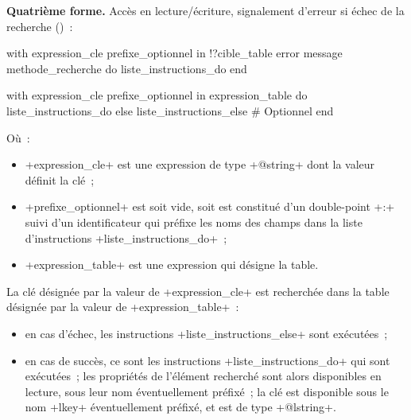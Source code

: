\textbf{Quatrième forme.} Accès en lecture/écriture, signalement d'erreur si échec de la recherche ()~:
\begin{galgas3}
with expression_cle prefixe_optionnel in !?cible_table
error message methode_recherche
do
  liste_instructions_do
end
\end{galgas3}






\begin{galgas3}
with expression_cle prefixe_optionnel in expression_table
do
  liste_instructions_do
else
  liste_instructions_else # Optionnel
end
\end{galgas3}

Où~:
\begin{itemize}
  \item \ggst+expression_cle+ est une expression de type \ggst+@string+ dont la valeur définit la clé~;
  \item \ggst+prefixe_optionnel+ est soit vide, soit est constitué d'un double-point \ggst+:+ suivi d'un identificateur qui préfixe les noms des champs dans la liste d'instructions \ggst+liste_instructions_do+~;
  \item \ggst+expression_table+ est une expression qui désigne la table.
\end{itemize}

La clé désignée par la valeur de \ggst+expression_cle+ est recherchée dans la table désignée par la valeur de \ggst+expression_table+~:
\begin{itemize}
  \item en cas d'échec, les instructions \ggst+liste_instructions_else+ sont exécutées~;
  \item en cas de succès, ce sont les instructions \ggst+liste_instructions_do+ qui sont exécutées~; les propriétés de l'élément recherché sont alors disponibles en lecture, sous leur nom éventuellement préfixé~; la clé est disponible sous le nom \ggst+lkey+ éventuellement préfixé, et est de type \ggst+@lstring+.
\end{itemize}

%
%


